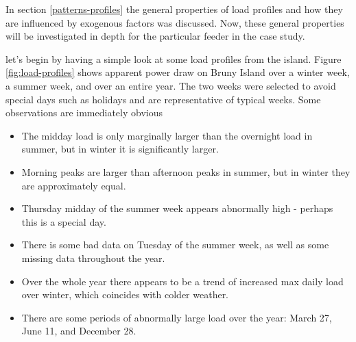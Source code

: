 In section \ref{patterns-profiles} the general properties of load profiles and how they are influenced by exogenous factors was discussed. Now, these general properties will be investigated in depth for the particular feeder in the case study.
\par
let's begin by having a simple look at some load profiles from the island.
Figure \ref{fig:load-profiles} shows apparent power draw on Bruny Island over a winter week, a summer week, and over an entire year.
The two weeks were selected to avoid special days such as holidays and are representative of typical weeks.
Some observations are immediately obvious
\begin{itemize}
	\item The midday load is only marginally larger than the overnight load in summer, but in winter it is significantly larger.
	\item Morning peaks are larger than afternoon peaks in summer, but in winter they are approximately equal.
	\item Thursday midday of the summer week appears abnormally high - perhaps this is a special day.
	\item There is some bad data on Tuesday of the summer week, as well as some missing data throughout the year.
	\item Over the whole year there appears to be a trend of increased max daily load over winter, which coincides with colder weather.
	\item There are some periods of abnormally large load over the year: March 27, June 11, and December 28.
\end{itemize}

